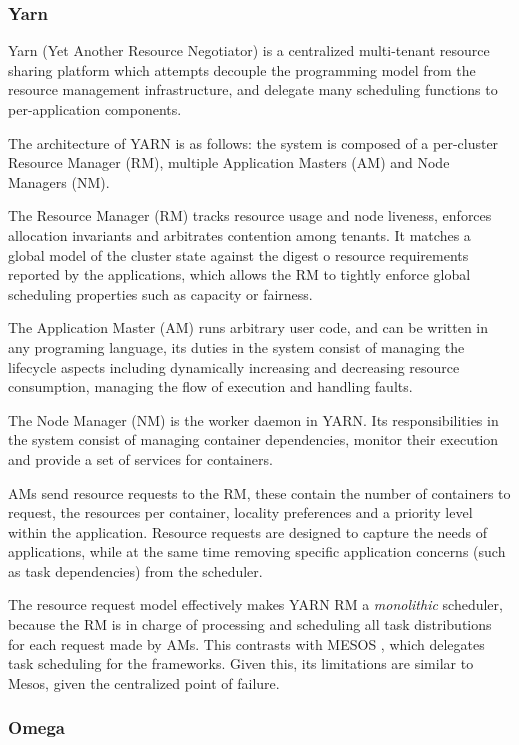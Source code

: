\subsubsection{Yarn}

Yarn (Yet Another Resource Negotiator) \cite{Vavilapalli2013ApacheHY} is a centralized multi-tenant resource sharing platform which attempts decouple the programming model from the resource management infrastructure, and delegate many scheduling functions to per-application components. 

The architecture of YARN is as follows: the system is composed of a per-cluster Resource Manager (RM), multiple Application Masters (AM) and Node Managers (NM). 

The Resource Manager (RM) tracks resource usage and node liveness, enforces allocation invariants and arbitrates contention among tenants. It matches a global model of the cluster state against the digest o resource requirements reported by the applications, which allows the RM to tightly enforce global scheduling properties such as capacity or fairness.

The Application Master (AM) runs arbitrary user code, and can be written in any programing language, its duties in the system consist of managing the lifecycle aspects including dynamically increasing and decreasing resource consumption, managing the flow of execution and handling faults. 

The Node Manager (NM) is the worker daemon in YARN. Its responsibilities in the system consist of managing container dependencies, monitor their execution and provide a set of services for containers. 

AMs send resource requests to the RM, these contain the number of containers to request, the resources per container, locality preferences and a priority level within the application. Resource requests are designed to capture the needs of applications, while at the same time removing specific application concerns (such as task dependencies) from the scheduler.

The resource request model effectively makes YARN RM a \textit{monolithic} scheduler, because the RM is in charge of processing and scheduling all task distributions for each request made by AMs. This contrasts with MESOS \cite{hindman2011mesos}, which delegates task scheduling for the frameworks. Given this, its limitations are similar to Mesos, given the centralized point of failure.

\subsubsection*{Omega}

